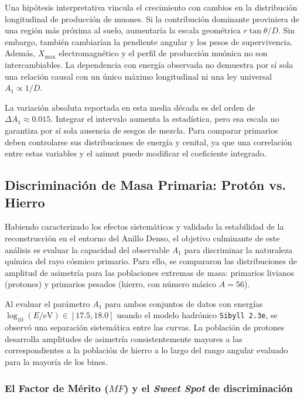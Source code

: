 Una hipótesis interpretativa vincula el crecimiento con cambios en la distribución longitudinal de producción de muones. Si la contribución dominante proviniera de una región más próxima al suelo, aumentaría la escala geométrica $r\tan\theta/D$. Sin embargo, también cambiarían la pendiente angular y los pesos de supervivencia. Además, $X_{\mathrm{max}}$ electromagnético y el perfil de producción muónica no son intercambiables. La dependencia con energía observada no demuestra por sí sola una relación causal con un único máximo longitudinal ni una ley universal $A_1\propto1/D$.

La variación absoluta reportada en esta media década es del orden de $\Delta A_1\approx0.015$. Integrar el intervalo aumenta la estadística, pero esa escala no garantiza por sí sola ausencia de sesgos de mezcla. Para comparar primarios deben controlarse sus distribuciones de energía y cenital, ya que una correlación entre estas variables y el azimut puede modificar el coeficiente integrado.

\subsection{Discriminación de Masa Primaria: Protón vs. Hierro}
\label{sec:discriminacion_masa}

Habiendo caracterizado los efectos sistemáticos y validado la estabilidad de la reconstrucción en el entorno del Anillo Denso, el objetivo culminante de este análisis es evaluar la capacidad del observable $A_1$ para discriminar la naturaleza química del rayo cósmico primario. Para ello, se compararon las distribuciones de amplitud de asimetría para las poblaciones extremas de masa: primarios livianos (protones) y primarios pesados (hierro, con número másico $A=56$). 

Al evaluar el parámetro $A_1$ para ambos conjuntos de datos con energías $\log_{10}(E/\mathrm{eV}) \in [17.5, 18.0]$ usando el modelo hadrónico \texttt{Sibyll 2.3e}, se observó una separación sistemática entre las curvas. La población de protones desarrolla amplitudes de asimetría consistentemente mayores a las correspondientes a la población de hierro a lo largo del rango angular evaluado para la mayoría de los bines.

\subsubsection{El Factor de Mérito ($MF$) y el \textit{Sweet Spot} de discriminación}
\label{subsec:sweet_spot}

